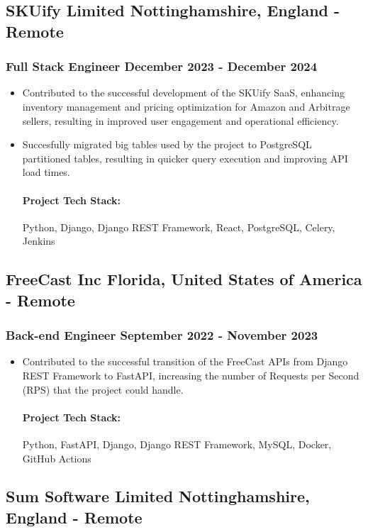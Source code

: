 \documentclass[11pt]{article} %
\begin{document}
\subsection{SKUify Limited \hfill Nottinghamshire, England - Remote}
\subsubsection{Full Stack Engineer \hfill  December 2023 - December 2024}
\begin{itemize}
    \item Contributed to the successful development of the SKUify SaaS, enhancing inventory management and pricing optimization for Amazon and Arbitrage sellers, resulting in improved user engagement and operational efficiency.
    \item Succesfully migrated big tables used by the project to PostgreSQL partitioned tables, resulting in quicker query execution and improving API load times.

    \paragraph{Project Tech Stack:} Python, Django, Django REST Framework, React, PostgreSQL, Celery, Jenkins
\end{itemize}

\subsection{FreeCast Inc \hfill Florida, United States of America - Remote}
\subsubsection{Back-end Engineer \hfill  September 2022 - November 2023}
\begin{itemize}
    \item Contributed to the successful transition of the FreeCast APIs from Django REST Framework to FastAPI, increasing the number of Requests per Second (RPS) that the project could handle.
    \paragraph{Project Tech Stack:} Python, FastAPI, Django, Django REST Framework, MySQL, Docker, GitHub Actions
\end{itemize}

\subsection{Sum Software Limited \hfill Nottinghamshire, England - Remote}
\end{document}
